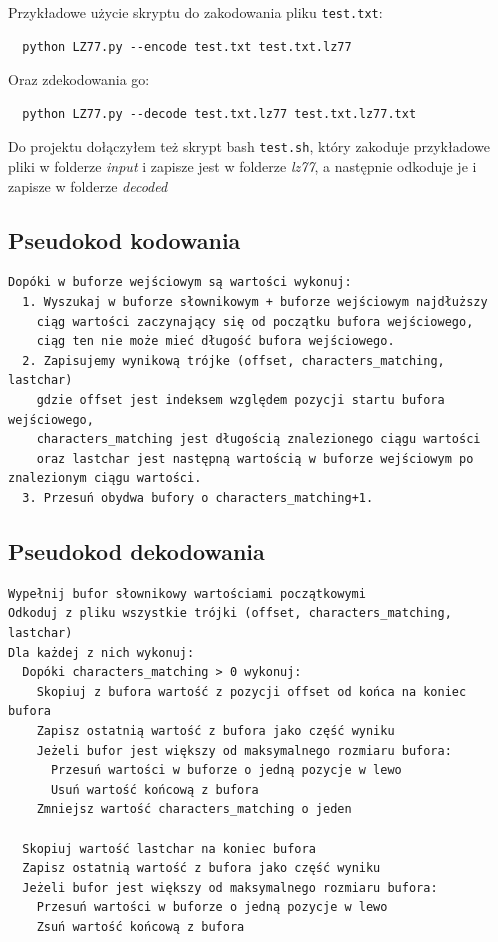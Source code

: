 \documentclass[12pt]{article}
\def\code#1{\texttt{#1}}
\begin{document}
Przykładowe użycie skryptu do zakodowania pliku \code{test.txt}:
\begin{verbatim}
  python LZ77.py --encode test.txt test.txt.lz77
\end{verbatim}

Oraz zdekodowania go:

\begin{verbatim}
  python LZ77.py --decode test.txt.lz77 test.txt.lz77.txt
\end{verbatim}

Do projektu dołączyłem też skrypt bash \code{test.sh}, 
który zakoduje przykładowe pliki w folderze \textit{input}
i zapisze jest w folderze \textit{lz77}, a następnie odkoduje je
i zapisze w folderze \textit{decoded}

\subsection{Pseudokod kodowania}
\begin{verbatim}
Dopóki w buforze wejściowym są wartości wykonuj:
  1. Wyszukaj w buforze słownikowym + buforze wejściowym najdłuższy
    ciąg wartości zaczynający się od początku bufora wejściowego,
    ciąg ten nie może mieć długość bufora wejściowego.
  2. Zapisujemy wynikową trójke (offset, characters_matching, lastchar) 
    gdzie offset jest indeksem względem pozycji startu bufora wejściowego, 
    characters_matching jest długością znalezionego ciągu wartości
    oraz lastchar jest następną wartością w buforze wejściowym po znalezionym ciągu wartości.
  3. Przesuń obydwa bufory o characters_matching+1.
\end{verbatim}
\subsection{Pseudokod dekodowania}
\begin{verbatim}
Wypełnij bufor słownikowy wartościami początkowymi
Odkoduj z pliku wszystkie trójki (offset, characters_matching, lastchar)
Dla każdej z nich wykonuj:
  Dopóki characters_matching > 0 wykonuj: 
    Skopiuj z bufora wartość z pozycji offset od końca na koniec bufora
    Zapisz ostatnią wartość z bufora jako część wyniku
    Jeżeli bufor jest większy od maksymalnego rozmiaru bufora:
      Przesuń wartości w buforze o jedną pozycje w lewo
      Usuń wartość końcową z bufora
    Zmniejsz wartość characters_matching o jeden
  
  Skopiuj wartość lastchar na koniec bufora
  Zapisz ostatnią wartość z bufora jako część wyniku
  Jeżeli bufor jest większy od maksymalnego rozmiaru bufora:
    Przesuń wartości w buforze o jedną pozycje w lewo
    Zsuń wartość końcową z bufora
\end{verbatim}
\end{document}
